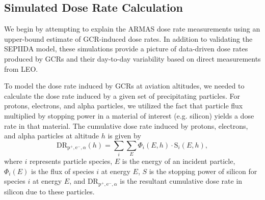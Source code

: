 \documentclass[draft]{agujournal2019}
\begin{document}
\subsection{Simulated Dose Rate Calculation}
\label{section:model:doserate_conversion}
We begin by attempting to explain the ARMAS dose rate measurements using an upper-bound estimate of GCR-induced dose rates. In addition to validating the SEPIIDA model, these simulations provide a picture of data-driven dose rates produced by GCRs and their day-to-day variability based on direct measurements from LEO.

To model the dose rate induced by GCRs at aviation altitudes, we needed to calculate the dose rate induced by a given set of precipitating particles. For protons, electrons, and alpha particles, we utilized the fact that particle flux multiplied by stopping power in a material of interest (e.g. silicon) yields a dose rate in that material. The cumulative dose rate induced by protons, electrons, and alpha particles at altitude $h$ is given by
%
\begin{equation}
  \text{DR}_{\text{p}^+,\text{e}^-,\alpha}(h) = \sum_i \sum_E \Phi_i(E,h) \cdot \text{S}_i(E,h),
\end{equation}
%
\noindent where $i$ represents particle species, $E$ is the energy of an incident particle, $\Phi_i(E)$ is the flux of species $i$ at energy $E$, $S$ is the stopping power of silicon for species $i$ at energy $E$, and DR$_{\text{p}^+,\text{e}^-,\alpha}$ is the resultant cumulative dose rate in silicon due to these particles.
\end{document}

